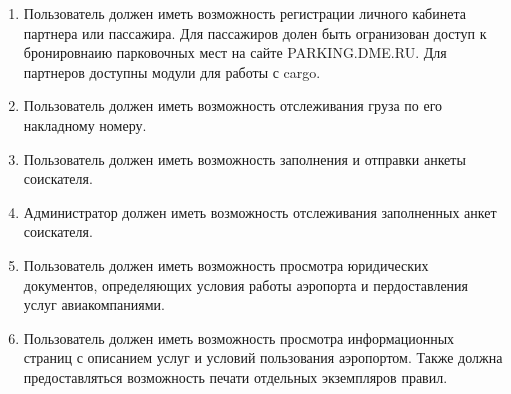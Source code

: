 \begin{enumerate}
    \item Пользователь должен иметь возможность регистрации личного кабинета партнера или пассажира. Для пассажиров долен быть огранизован
    доступ к бронировнаию парковочных мест на сайте PARKING.DME.RU. Для партнеров доступны модули для работы с cargo.
    
    \item Пользователь должен иметь возможность отслеживания груза по его накладному номеру.
    
    \item Пользователь должен иметь возможность заполнения и отправки анкеты соискателя.
    
    \item Администратор должен иметь возможность отслеживания заполненных анкет соискателя.
    
    \item Пользователь должен иметь возможность просмотра юридических документов, определяющих условия работы аэропорта и пердоставления услуг 
    авиакомпаниями.

    \item Пользователь должен иметь возможность просмотра информационных страниц с описанием услуг и условий пользования аэропортом.
    Также должна предоставляться возможность печати отдельных экземпляров правил.
\end{enumerate}